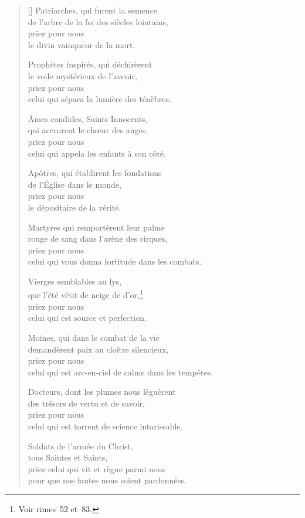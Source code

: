 \begin{verse}[\versewidth]
  Patriarches, qui furent la semence \\
  de l'arbre de la foi des siècles lointains, \\
  priez pour nous \\
  le divin vainqueur de la mort.

  Prophètes inspirés, qui déchirèrent \\
  le voile mystérieux de l'avenir, \\
  priez pour nous \\
  celui qui sépara la lumière des ténèbres.

  Âmes candides, Saints Innocents, \\
  qui accrurent le chœur des anges, \\
  priez pour nous \\
  celui qui appela les enfants à son côté.

  Apôtres, qui établirent les fondations \\
  de l'Église dans le monde, \\
  priez pour nous \\
  le dépositaire de la vérité.

  Martyres qui remportèrent leur palme \\
  rouge de sang dans l'arène des cirques, \\
  priez pour nous \\
  celui qui vous donna fortitude dans les combats.

  Vierges semblables au lys, \\
  que l'été vêtit de neige de d'or,\footnote{Voir rimes~52 et~83.} \\
  priez pour nous \\
  celui qui est source et perfection.

  Moines, qui dans le combat de la vie \\
  demandèrent paix au cloître silencieux, \\
  priez pour nous \\
  celui qui est arc-en-ciel de calme dans les tempêtes.

  Docteurs, dont les plumes nous léguèrent \\
  des trésors de vertu et de savoir, \\
  priez pour nous \\
  celui qui est torrent de science intarissable.

  Soldats de l'armée du Christ, \\
  tous Saintes et Saints, \\
  priez celui qui vit et règne parmi nous \\
  pour que nos fautes nous soient pardonnées.
\end{verse}

